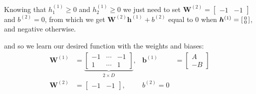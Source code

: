 \documentclass[11pt]{article}
\begin{document}
Knowing that $h^{(1)}_{1} \geq 0$ and $h^{(1)}_{2} \geq 0$ we just need to set  $\bm{W}^{(2)} = \begin{bmatrix} - 1 & -1 \end{bmatrix}$ and $b^{(2)} = 0$, from which we get $\bm{W}^{(2)} \bm{h}^{(1)} + b^{(2)}$ equal to $0$ when $\bm{h}^{(1)} = \begin{bsmallmatrix} 0 \\ 0 \end{bsmallmatrix}$, and negative otherwise.

and so we learn our desired function with the weights and biases:
\begin{align*}
  \bm{W}^{(1)} &= \underbrace{\begin{bmatrix}
                   -1 &\cdots  &-1 \\
                   1 &\cdots &1
                 \end{bmatrix}}_{2 \times D}, &\bm{b}^{(1)} &= \begin{bmatrix}
                                                  A \\
                                                  -B
                                                 \end{bmatrix} \\
  \bm{W}^{(2)} &= \begin{bmatrix}
                   -1 & -1
                 \end{bmatrix}, & b^{(2)} = 0
\end{align*}
\end{document}
